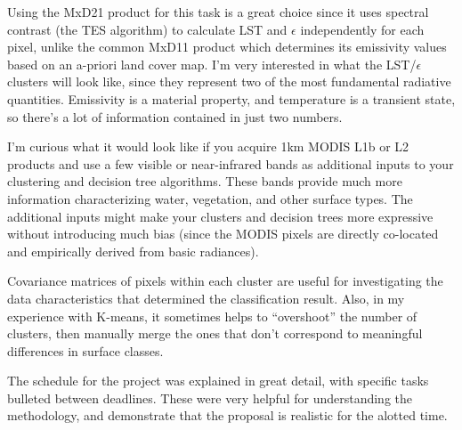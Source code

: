 \documentclass[12pt]{article}
\begin{document}
Using the MxD21 product for this task is a great choice since it uses spectral contrast (the TES algorithm) to calculate LST and $\epsilon$ independently for each pixel, unlike the common MxD11 product which determines its emissivity values based on an a-priori land cover map. I'm very interested in what the LST/$\epsilon$ clusters will look like, since they represent two of the most fundamental radiative quantities. Emissivity is a material property, and temperature is a transient state, so there's a lot of information contained in just two numbers.

I'm curious what it would look like if you acquire 1km MODIS L1b or L2 products and use a few visible or near-infrared bands as additional inputs to your clustering and decision tree algorithms. These bands provide much more information characterizing water, vegetation, and other surface types. The additional inputs might make your clusters and decision trees more expressive without introducing much bias (since the MODIS pixels are directly co-located and empirically derived from basic radiances).

Covariance matrices of pixels within each cluster are useful for investigating the data characteristics that determined the classification result. Also, in my experience with K-means, it sometimes helps to ``overshoot'' the number of clusters, then manually merge the ones that don't correspond to meaningful differences in surface classes.

The schedule for the project was explained in great detail, with specific tasks bulleted between deadlines. These were very helpful for understanding the methodology, and demonstrate that the proposal is realistic for the alotted time.


%
\end{document}
